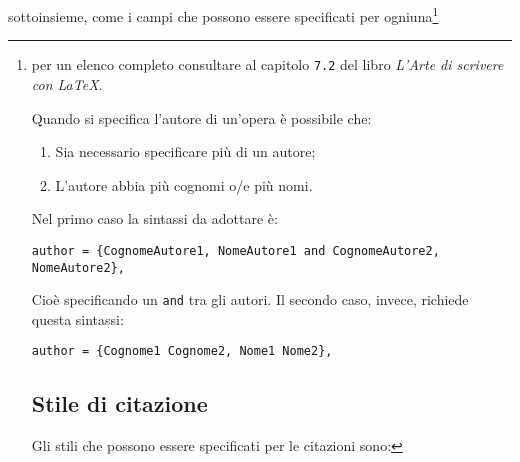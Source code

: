 sottoinsieme, come i campi che possono essere specificati per ogniuna\footnote{
per un elenco completo consultare al capitolo \texttt{7.2} del libro \textit{
L'Arte di scrivere con \LaTeX{}}.
\par Quando si specifica l'autore di un'opera è possibile che:
\begin{enumerate}
    \item Sia necessario specificare più di un autore;
    \item L'autore abbia più cognomi o/e più nomi.
\end{enumerate}
Nel primo caso la sintassi da adottare è:
\begin{lstlisting}
author = {CognomeAutore1, NomeAutore1 and CognomeAutore2, NomeAutore2},
\end{lstlisting}
Cioè specificando un \texttt{and} tra gli autori. Il secondo caso, invece, 
richiede questa sintassi:
\begin{lstlisting}
author = {Cognome1 Cognome2, Nome1 Nome2},
\end{lstlisting}

\subsection{Stile di citazione}
Gli stili che possono essere specificati per le citazioni sono:
}

